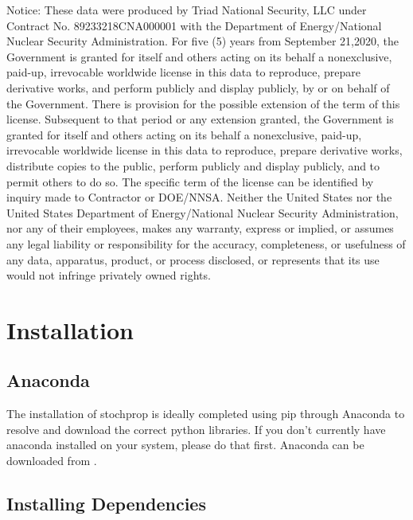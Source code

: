 \documentclass[letterpaper,10pt,english]{sphinxmanual}
\begin{document}
Notice: These data were produced by Triad National Security, LLC under Contract No. 89233218CNA000001 with the Department of Energy/National Nuclear Security Administration. For five (5) years from September 21,2020, the Government is granted for itself and others acting on its behalf a nonexclusive, paid-up, irrevocable worldwide license in this data to reproduce, prepare derivative works, and perform publicly and display publicly, by or on behalf of the Government. There is provision for the possible extension of the term of this license. Subsequent to that period or any extension granted, the Government is granted for itself and others acting on its behalf a nonexclusive, paid-up, irrevocable worldwide license in this data to reproduce, prepare derivative works, distribute copies to the public, perform publicly and display publicly, and to permit others to do so. The specific term of the license can be identified by inquiry made to Contractor or DOE/NNSA. Neither the United States nor the United States Department of Energy/National Nuclear Security Administration, nor any of their employees, makes any warranty, express or implied, or assumes any legal liability or responsibility for the accuracy, completeness, or usefulness of any data, apparatus, product, or process disclosed, or represents that its use would not infringe privately owned rights.


\section{Installation}
\label{\detokenize{installation:installation}}\label{\detokenize{installation:id1}}\label{\detokenize{installation::doc}}

\subsection{Anaconda}
\label{\detokenize{installation:anaconda}}
The installation of stochprop is ideally completed using pip through Anaconda to resolve and download the correct python libraries. If you don’t currently have anaconda installed
on your system, please do that first.  Anaconda can be downloaded from .


\subsection{Installing Dependencies}
\label{\detokenize{installation:installing-dependencies}}
\end{document}
